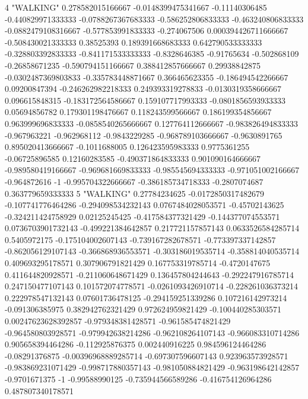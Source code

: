 4 "WALKING" 0.278582015166667 -0.0148399475341667 -0.11140306485 -0.440829971333333 -0.0788267367683333 -0.586252806833333 -0.463240806833333 -0.0882479108316667 -0.577853991833333 -0.274067506 0.000394426711666667 -0.508430021333333 0.38525393 0.189391668683333 0.642790533333333 -0.328803392833333 -0.841171533333333 -0.8328646385 -0.91765634 -0.502868109 -0.26858671235 -0.590794151166667 0.388412857666667 0.29938842875 -0.0302487369803833 -0.335783448871667 0.366465623355 -0.186494542266667 0.09200847394 -0.246262982218333 0.249393319278833 -0.0130319358666667 0.096615848315 -0.183172564586667 0.159107717993333 -0.0801856593933333 0.05694856782 0.179301198476667 0.118243599566667 0.186199354856667 0.963999696833333 -0.0858540265666667 0.127764112666667 -0.983826494833333 -0.967963221 -0.962968112 -0.9843229285 -0.968789103666667 -0.9630891765 0.895020413666667 -0.1011688005 0.126423595983333 0.9775361255 -0.06725896585 0.12160283585 -0.490371864833333 0.901090164666667 -0.989580419166667 -0.969681669833333 -0.985545694333333 -0.971051002166667 -0.964872616 -1 -0.995704322666667 -0.386185734718333 -0.2807074687 0.363779659333333
5 "WALKING" 0.27784234625 -0.0172850317482679 -0.107741776464286 -0.294098534232143 0.0767484028053571 -0.45702143625 -0.324211424758929 0.02125245425 -0.417584377321429 -0.144377074553571 0.0736703901732143 -0.499221384642857 0.217721157857143 0.0633526584285714 0.5405972175 -0.175104002607143 -0.739167282678571 -0.773397337142857 -0.862056129107143 -0.366868936553571 -0.303186019535714 -0.358814040535714 0.409693295178571 0.307906791821429 0.167753319785714 -0.4720147675 0.411644820928571 -0.211060648671429 0.136457804244643 -0.292247916785714 0.247150477107143 0.101572074778571 -0.0261093426910714 -0.228261036373214 0.222978547132143 0.07601736478125 -0.294159251339286 0.107216142973214 -0.091306385975 0.382942762321429 0.972624959821429 -0.100440285303571 0.00247623628392857 -0.979348381428571 -0.961585474821429 -0.964580803928571 -0.979942638214286 -0.962108264107143 -0.966083310714286 0.905658394464286 -0.112925876375 0.002440916225 0.984596124464286 -0.08291376875 -0.00396968889285714 -0.697307596607143 0.923963573928571 -0.983869231071429 -0.998717880357143 -0.981050884821429 -0.963198642142857 -0.9701671375 -1 -0.99588990125 -0.735944566589286 -0.416754126964286 0.487807340178571
